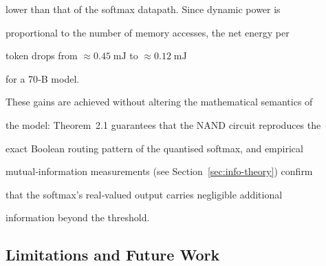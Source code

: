 \begin{enumerate}
    lower than that of the softmax datapath.  Since dynamic power is






    proportional to the number of memory accesses, the net energy per






    token drops from \(\approx 0.45\;\text{mJ}\) to \(\approx 0.12\;\text{mJ}\)






    for a 70‑B model.






\end{enumerate}













These gains are achieved without altering the mathematical semantics of






the model: Theorem~2.1 guarantees that the NAND circuit reproduces the






exact Boolean routing pattern of the quantised softmax, and empirical






mutual‑information measurements (see Section~\ref{sec:info-theory}) confirm






that the softmax’s real‑valued output carries negligible additional






information beyond the threshold.













\subsection{Limitations and Future Work}






